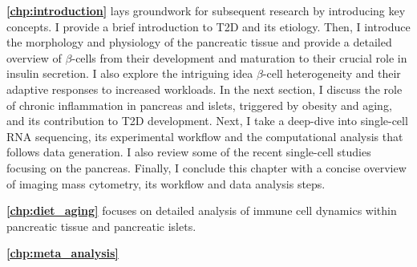 \par \textbf{\autoref{chp:introduction}} lays groundwork for subsequent research by introducing key concepts. I provide a brief introduction to T2D and its etiology. Then, I introduce the morphology and physiology of the pancreatic tissue and provide a detailed overview of $\beta$-cells from their development and maturation to their crucial role in insulin secretion. I also explore the intriguing idea $\beta$-cell heterogeneity and their adaptive responses to increased workloads. In the next section, I discuss the role of chronic inflammation in pancreas and islets, triggered by obesity and aging, and its contribution to T2D development. Next, I take a deep-dive into single-cell RNA sequencing, its experimental workflow and the computational analysis that follows data generation. I also review some of the recent single-cell studies focusing on the pancreas. Finally, I conclude this chapter with a concise overview of imaging mass cytometry, its workflow and data analysis steps.\\
\par \textbf{\autoref{chp:diet_aging}} focuses on detailed analysis of immune cell dynamics within pancreatic tissue and pancreatic islets.\\ 
\par \textbf{\autoref{chp:meta_analysis}}







